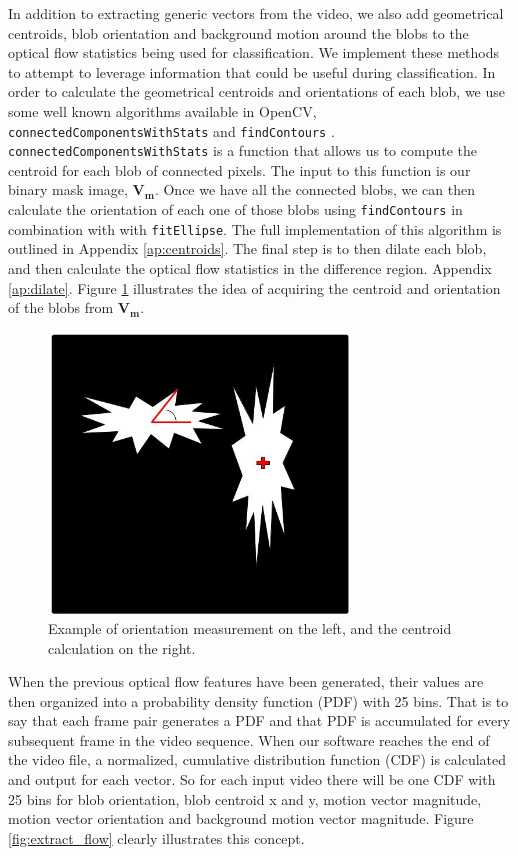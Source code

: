 In addition to extracting generic vectors from the video, we also add
geometrical centroids, blob orientation and background motion around the blobs
to the optical flow statistics being used for classification. We implement these
methods to attempt to leverage information that could be useful during
classification. In order to calculate the geometrical centroids and orientations
of each blob, we use some well known algorithms available in OpenCV,
\texttt{connectedComponentsWithStats} and \texttt{findContours}
\cite{itseez2015opencv}. \texttt{connectedComponentsWithStats} is a function
that allows us to compute the centroid for each blob of connected pixels. The
input to this function is our binary mask image, $\mathbf{V_m}$. Once we have
all the connected blobs, we can then calculate the orientation of each one of
those blobs using \texttt{findContours} in combination with with
\texttt{fitEllipse}. The full implementation of this algorithm is outlined in
Appendix \ref{ap:centroids}. The final step is to then dilate each blob, and
then calculate the optical flow statistics in the difference region. Appendix
\ref{ap:dilate}. Figure \ref{fig:orient_cent} illustrates the idea of acquiring
the centroid and orientation of the blobs from $\mathbf{V_m}$.

\begin{figure}[h]
  \label{fig:orient_cent}
  \centering
  \includegraphics[width=8cm]{figures/cent_and_orient}
  \caption{Example of orientation measurement on the left, and the centroid calculation on the right.}
\end{figure}

When the previous optical flow features have been generated, their values are then
organized into a probability density function (PDF) with 25 bins. That is to say that
each frame pair generates a PDF and that PDF is accumulated for every subsequent
frame in the video sequence. When our software reaches the end of the video file,
a normalized, cumulative distribution function (CDF) is calculated and output
for each vector. So for each input video there will be one CDF with 25 bins
for blob orientation, blob centroid x and y, motion vector magnitude, motion
vector orientation and background motion vector magnitude. Figure \ref{fig:extract_flow}
clearly illustrates this concept.

